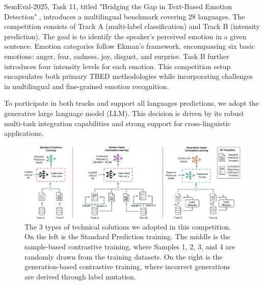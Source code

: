 \documentclass[11pt]{article}
\begin{document}

SemEval-2025, Task 11, titled "Bridging the Gap in Text-Based Emotion Detection" \cite{muhammad-etal-2025-semeval}, introduces a multilingual benchmark covering 28 languages\cite{muhammad2025brighterbridginggaphumanannotated,belay-etal-2025-evaluating}. The competition consists of Track A (multi-label classification) and Track B (intensity prediction). The goal is to identify the speaker's perceived emotion in a given sentence. Emotion categories follow Ekman's framework\cite{ekman1969repertoire}, encompassing six basic emotions: anger, fear, sadness, joy, disgust, and surprise. Task B further introduces four intensity levels for each emotion. This competition setup encapsulates both primary TBED methodologies while incorporating challenges in multilingual and fine-grained emotion recognition. 


To participate in both tracks and support all languages predictions, we adopt the generative large language model (LLM). This decision is driven by its robust multi-task integration capabilities and strong support for cross-linguistic applications.

\begin{figure}[h]
  \centering
  \includegraphics[width=430pt]{Overall}
  \vspace{-5pt}
  \caption{The 3 types of technical solutions we adopted in this competition. On the left is the Standard Prediction training. The middle is the sample-based contrastive training, where Samples 1, 2, 3, and 4 are randomly drawn from the training datasets. On the right is the generation-based contrastive training, where incorrect generations are derived through label mutation.}
  \label{fig:Overall}
 \vspace{-15pt}
\end{figure}
\end{document}
